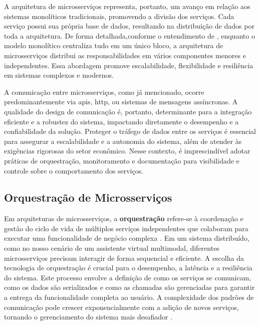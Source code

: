 A arquitetura de microsserviços representa, portanto, um avanço em relação aos sistemas monolíticos tradicionais, promovendo a divisão dos serviços. Cada serviço possui sua própria base de dados, resultando na distribuição de dados por toda a arquitetura. De forma detalhada,conforme o entendimento de \textcite{lewis_microservices_2014}, enquanto o modelo monolítico centraliza tudo em um único bloco, a arquitetura de microsserviços distribui as responsabilidades em vários componentes menores e independentes. Essa abordagem promove escalabilidade, flexibilidade e resiliência em sistemas complexos e modernos.

A comunicação entre microsserviços, como já mencionado, ocorre predominantemente via \gls{api}s, \gls{http}, ou sistemas de mensagens assíncronas. A qualidade do design de comunicação é, portanto, determinante para a integração eficiente e a robustez do sistema, impactando diretamente o desempenho e a confiabilidade da solução. Proteger o tráfego de dados entre os serviços é essencial para assegurar a escalabilidade e a autonomia do sistema, além de atender às exigências rigorosas do setor econômico. Nesse contexto, é imprescindível adotar práticas de orquestração, monitoramento e documentação para visibilidade e controle sobre o comportamento dos serviços.

\subsection{Orquestração de Microsserviços}

Em arquiteturas de microsserviços, a \textbf{orquestração} refere-se à coordenação e gestão do ciclo de vida de múltiplos serviços independentes que colaboram para executar uma funcionalidade de negócio complexa \cite{newman_building_2022}. Em um sistema distribuído, como no nosso cenário de um assistente virtual multimodal, diferentes microsserviços precisam interagir de forma sequencial e eficiente. A escolha da tecnologia de orquestração é crucial para o desempenho, a latência e a resiliência do sistema. Este processo envolve a definição de como os serviços se comunicam, como os dados são serializados e como as chamadas são gerenciadas para garantir a entrega da funcionalidade completa ao usuário. A complexidade dos padrões de comunicação pode crescer exponencialmente com a adição de novos serviços, tornando o gerenciamento do sistema mais desafiador \cite{kleppmann_designing_2017}.

